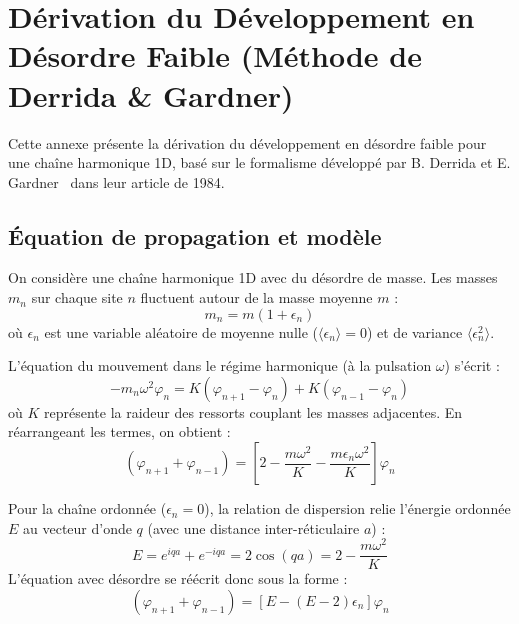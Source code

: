 \section{Dérivation du Développement en Désordre Faible (Méthode de Derrida \& Gardner)}\label{annexe:derrida-derivation}

Cette annexe présente la dérivation du développement en désordre faible pour une chaîne harmonique 1D, basé sur le formalisme développé par B. Derrida et E. Gardner~\cite{derrida1984lyapounov} dans leur article de 1984.

\subsection{Équation de propagation et modèle}

On considère une chaîne harmonique 1D avec du désordre de masse. Les masses $m_n$ sur chaque site $n$ fluctuent autour de la masse moyenne $m$ :
\begin{equation*}
    m_n = m(1 + \epsilon_n)
\end{equation*}
où $\epsilon_n$ est une variable aléatoire de moyenne nulle ($\langle\epsilon_n\rangle = 0$) et de variance $\langle\epsilon_n^2\rangle$.

L'équation du mouvement dans le régime harmonique (à la pulsation $\omega$) s'écrit :
\begin{equation*}
    -m_n\omega^2\varphi_n = K(\varphi_{n+1} - \varphi_n) + K(\varphi_{n-1} - \varphi_n)
\end{equation*}
où $K$ représente la raideur des ressorts couplant les masses adjacentes. En réarrangeant les termes, on obtient :
\begin{equation*}
    (\varphi_{n+1} + \varphi_{n-1}) = \left[ 2 - \frac{m\omega^2}{K} - \frac{m\epsilon_n\omega^2}{K} \right] \varphi_n
\end{equation*}

Pour la chaîne ordonnée ($\epsilon_n = 0$), la relation de dispersion relie l'énergie ordonnée $E$ au vecteur d'onde $q$ (avec une distance inter-réticulaire $a$) :
\begin{equation*}
    E = e^{iqa} + e^{-iqa} = 2\cos(qa) = 2 - \frac{m\omega^2}{K}
\end{equation*}
L'équation avec désordre se réécrit donc sous la forme :
\begin{equation*}
    (\varphi_{n+1} + \varphi_{n-1}) = \left[ E - (E - 2)\epsilon_n \right] \varphi_n
\end{equation*}

